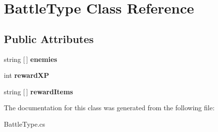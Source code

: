 \hypertarget{class_battle_type}{}\section{Battle\+Type Class Reference}
\label{class_battle_type}
\subsection*{Public Attributes}
\begin{DoxyCompactItemize}
\item 
\mbox{\label{class_battle_type_ab7e61ed1a8fb1edbb6d69af0887de1ee}} 
string \mbox{[}$\,$\mbox{]} {\bfseries enemies}
\item 
\mbox{\label{class_battle_type_ab09b2f620245c93a83efd93a58a81848}} 
int {\bfseries reward\+XP}
\item 
\mbox{\label{class_battle_type_a771056c6d6587af38153d1b99fcaffd9}} 
string \mbox{[}$\,$\mbox{]} {\bfseries reward\+Items}
\end{DoxyCompactItemize}


The documentation for this class was generated from the following file\+:\begin{DoxyCompactItemize}
\item 
Battle\+Type.\+cs\end{DoxyCompactItemize}
